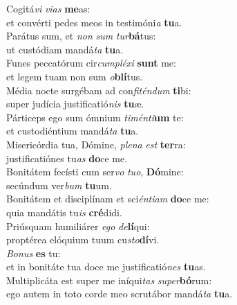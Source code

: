 \oddverse Cogitá\textit{vi} \textit{vi}\textit{as} \textbf{me}as:~\*\\
\oddverse et convérti pedes meos in testimóni\textit{a} \textbf{tu}a.\\
\evenverse Parátus sum, et \textit{non} \textit{sum} \textit{tur}\textbf{bá}tus:~\*\\
\evenverse ut custódiam mandá\textit{ta} \textbf{tu}a.\\
\oddverse Funes peccatórum cir\textit{cum}\textit{plé}\textit{xi} \textbf{sunt} me:~\*\\
\oddverse et legem tuam non sum \textit{o}\textbf{blí}tus.\\
\evenverse Média nocte surgébam ad con\textit{fi}\textit{tén}\textit{dum} \textbf{ti}bi:~\*\\
\evenverse super judícia justificatió\textit{nis} \textbf{tu}æ.\\
\oddverse Párticeps ego sum ómnium \textit{ti}\textit{mén}\textit{ti}\textbf{um} te:~\*\\
\oddverse et custodiéntium mandá\textit{ta} \textbf{tu}a.\\
\evenverse Misericórdia tua, Dómine, \textit{ple}\textit{na} \textit{est} \textbf{ter}ra:~\*\\
\evenverse justificatiónes tu\textit{as} \textbf{do}ce me.\\
\oddverse Bonitátem fecísti cum ser\textit{vo} \textit{tu}\textit{o}, \textbf{Dó}mine:~\*\\
\oddverse secúndum ver\textit{bum} \textbf{tu}um.\\
\evenverse Bonitátem et disciplínam et sci\textit{én}\textit{ti}\textit{am} \textbf{do}ce me:~\*\\
\evenverse quia mandátis tu\textit{is} \textbf{cré}didi.\\
\oddverse Priúsquam humiliárer \textit{e}\textit{go} \textit{de}\textbf{lí}qui:~\*\\
\oddverse proptérea elóquium tuum cu\textit{sto}\textbf{dí}vi.\\
\evenverse \textit{Bo}\textit{nus} \textbf{es} tu:~\*\\
\evenverse et in bonitáte tua doce me justificatió\textit{nes} \textbf{tu}as.\\
\oddverse Multiplicáta est super me iníqui\textit{tas} \textit{su}\textit{per}\textbf{bó}rum:~\*\\
\oddverse ego autem in toto corde meo scrutábor mandá\textit{ta} \textbf{tu}a.\\
